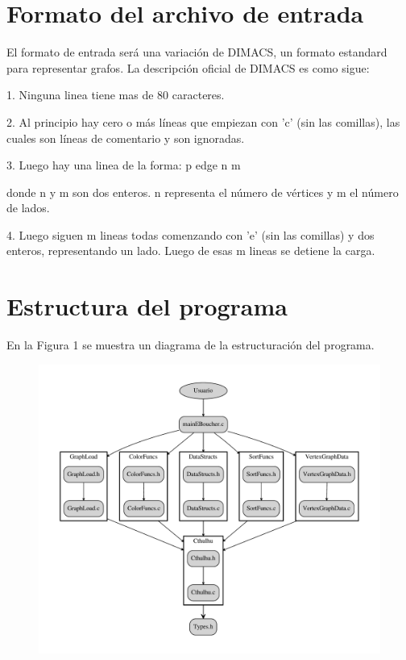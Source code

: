 \documentclass[11pt,a4paper]{article}
\theoremstyle{plain}
\begin{document}
\section{Formato del archivo de entrada}
\label{sec:2}

El formato de entrada será una variación de DIMACS, un formato estandard para representar grafos.
La descripción oficial de DIMACS es como sigue:

1. Ninguna linea tiene mas de 80 caracteres.

2. Al principio hay cero o más líneas que empiezan con 'c' (sin las comillas), las cuales son líneas de comentario y son ignoradas.

3. Luego hay una linea de la forma:
p edge n m

donde n y m son dos enteros. n representa el número de vértices y m el número de lados.

4. Luego siguen m lineas todas comenzando con 'e' (sin las comillas) y dos enteros, representando un lado. Luego de esas m lineas se detiene la carga.

\newpage


\section{Estructura del programa}

En la Figura 1 se muestra un diagrama de la estructuración del programa.\\ 

\begin{figure}[htp]
\centering
\includegraphics[scale=0.65]{diagram.pdf}
{\caption{}}
\label{fig:1}
\end{figure}
\end{document}
